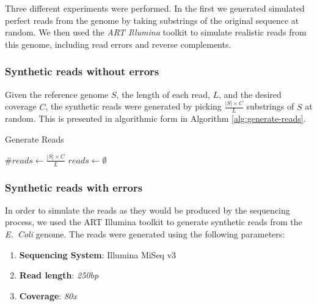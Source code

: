 
Three different experiments were performed. In the first we generated simulated perfect reads from the genome by taking substrings of 
the original sequence at random. We then used the \emph{ART Illumina} toolkit  to simulate realistic reads from this
genome, including read errors and reverse complements. 

\subsubsection{Synthetic reads without errors}

Given the reference genome $S$, the length of each read, $L$, and the desired coverage $C$, the synthetic reads were generated by picking
$\frac{|S| \times C}{L}$ substrings of $S$ at random. This is presented in algorithmic form in Algorithm \ref{alg:generate-reads}.

\begin{algorithm}
  \caption{Generate Reads}\label{alg:generate-reads}
  $\mathit{\#reads} \gets \frac{|S| \times C}{L}$\;
  $reads \gets \emptyset$\;
\end{algorithm}

\subsubsection{Synthetic reads with errors}

In order to simulate the reads as they would be produced by the sequencing process, we used the ART Illumina toolkit to generate
synthetic reads from the \emph{E.~Coli} genome. The reads were generated using the following parameters:

\begin{enumerate}
\item \textbf{Sequencing System}: Illumina MiSeq v3
\item \textbf{Read length}: \textit{250bp}
\item \textbf{Coverage}: \textit{80x}
\end{enumerate}